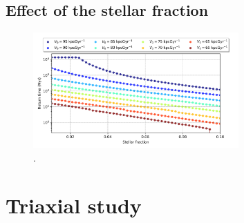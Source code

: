 	\subsection{Effect of the stellar fraction}
	\begin{figure}[h]
		\centering
		\includegraphics[width = 0.7\textwidth]{"../Files/Week 7/Symmetric/returntimes_stellar_speed"}
		\caption{.}
		\label{fig: stellarfraction}
	\end{figure}

	\section{Triaxial study}	
